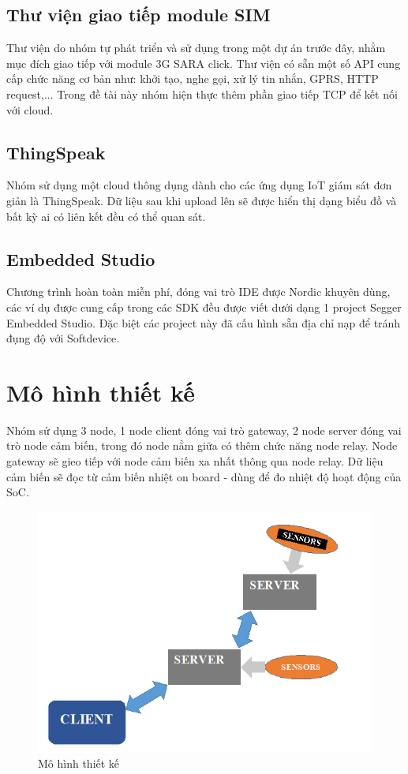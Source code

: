     	\subsection{Thư viện giao tiếp module SIM}
    	Thư viện do nhóm tự phát triển và sử dụng trong một dự án trước đây, nhằm mục đích giao tiếp với module 3G SARA click. Thư viện có sẵn một số API cung cấp chức năng cơ bản như: khởi tạo, nghe gọi, xử lý tin nhắn, GPRS, HTTP request,... Trong đề tài này nhóm hiện thực thêm phần giao tiếp TCP để kết nối với cloud.
    	\subsection{ThingSpeak}
    	Nhóm sử dụng một cloud thông dụng dành cho các ứng dụng IoT giám sát đơn giản là ThingSpeak. Dữ liệu sau khi upload lên sẽ được hiển thị dạng biểu đồ và bất kỳ ai có liên kết đều có thể quan sát.
    	\subsection{Embedded Studio}
    	Chương trình hoàn toàn miễn phí, đóng vai trò IDE được Nordic khuyên dùng, các ví dụ được cung cấp trong các SDK đều được viết dưới dạng 1 project Segger Embedded Studio. Đặc biệt các project này đã cấu hình sẵn địa chỉ nạp để tránh đụng độ với Softdevice.
    \section{Mô hình thiết kế}
    Nhóm sử dụng 3 node, 1 node client đóng vai trò gateway, 2 node server đóng vai trò node cảm biến, trong đó node nằm giữa có thêm chức năng node relay. Node gateway sẽ gieo tiếp với node cảm biến xa nhất thông qua node relay. Dữ liệu cảm biến sẽ đọc từ cảm biến nhiệt on board - dùng để đo nhiệt độ hoạt động của SoC.
    \begin{figure}[h!]
    	\begin{center}
    		\includegraphics[scale=0.7]{images/design-model.png}
    		\caption{Mô hình thiết kế}
    	\end{center}
    \end{figure}
    
